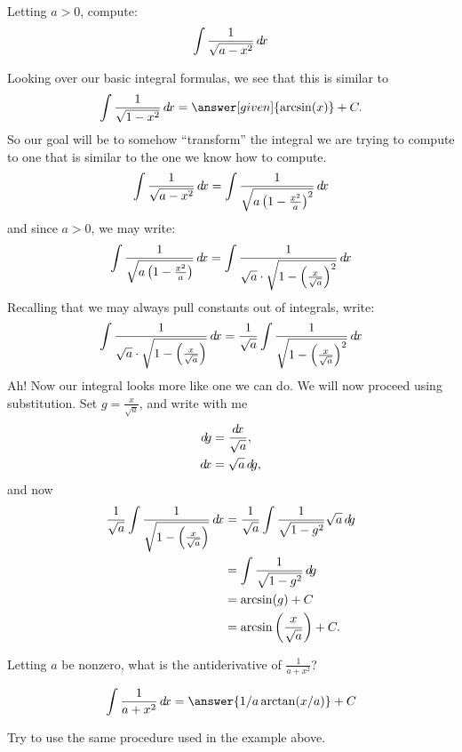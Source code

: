 \documentclass{ximera}
\begin{document}
\begin{example}
  Letting $a>0$, compute:
  \[
  \int \frac{1}{\sqrt{a-x^2}} \mathop{}\!d\! x
  \]
  \begin{explanation}
    Looking over our basic integral formulas, we see that this is similar to
    \[
    \int \frac{1}{\sqrt{1-x^2}}\d x= \answer[given]{\arcsin(x)}+C.
    \]
    So our goal will be to somehow ``transform'' the integral we are
    trying to compute to one that is similar to the one we know how to
    compute.
    \[
    \int \frac{1}{\sqrt{a-x^2}} \mathop{}\!d\! x  =
    \int \frac{1}{\sqrt{a\left(1-\frac{x^2}{a}\right)^2}} \mathop{}\!d\! x
    \]
    and since $a>0$, we may write:
    \[
    \int \frac{1}{\sqrt{a\left(1-\frac{x^2}{a}\right)}} \mathop{}\!d\! x=
    \int \frac{1}{\sqrt{a}\cdot \sqrt{1-\left(\frac{x}{\sqrt{a}}\right)^2}} \mathop{}\!d\! x
    \]
    Recalling that we may always pull constants out of integrals, write:
    \[
    \int \frac{1}{\sqrt{a}\cdot \sqrt{1-\left(\frac{x}{\sqrt{a}}\right)}} \mathop{}\!d\! x = 
    \frac{1}{\sqrt{a}}\int \frac{1}{\sqrt{1-\left(\frac{x}{\sqrt{a}}\right)^2}} \mathop{}\!d\! x 
    \]
    Ah! Now our integral looks more like one we can do. We will now
    proceed using substitution. Set $g = \frac{x}{\sqrt{a}}$, and write with me
    \begin{align*}
      \d g &= \frac{\d x}{\sqrt{a}},\\
      \d x &= \sqrt{a}\d g,
    \end{align*}
    and now
    \begin{align*}
    \frac{1}{\sqrt{a}}\int \frac{1}{\sqrt{1-\left(\frac{x}{\sqrt{a}}\right)}} \mathop{}\!d\! x &=
    \frac{1}{\sqrt{a}}\int \frac{1}{\sqrt{1-g^2}} \sqrt{a} \mathop{}\!d\! g\\
    &=\int \frac{1}{\sqrt{1-g^2}}\mathop{}\!d\! g\\
    &=\arcsin(g) + C\\
    &=\arcsin\left(\frac{x}{\sqrt{a}}\right) + C.
    \end{align*}
  \end{explanation}
\end{example}





\begin{question}
  Letting $a$ be nonzero, what is the antiderivative of $\frac{1}{a +
    x^2}$?
  \begin{prompt}%
    \[
    \int \frac{1}{a + x^2} \d x = \answer{1/a \arctan(x/a)}+C
    \]
  \end{prompt}
  \begin{hint}
    Try to use the same procedure used in the example above.
  \end{hint}
\end{question}
\end{document}
